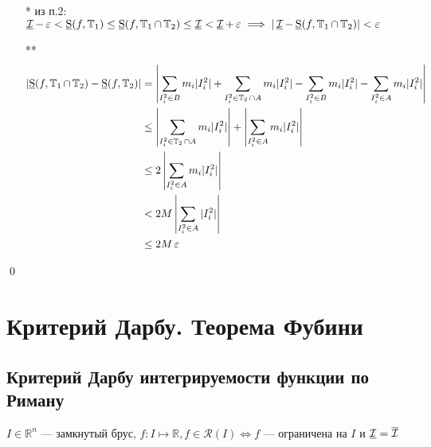 \documentclass[a4paper, 10pt]{article}
\begin{document}
\begin{itemize}
    \item[*] из п.2: $\operatorname{\underline{\mathcal{I}}} - \operatorname{\varepsilon} < \operatorname{\underline{S}}(f, \operatorname{\mathbb{T}}_1) \le \operatorname{\underline{S}}(f, \operatorname{\mathbb{T}}_1\cap \operatorname{\mathbb{T}}_2) \le \operatorname{\underline{\mathcal{I}}} < \operatorname{\underline{\mathcal{I}}} + \operatorname{\varepsilon} \implies |\operatorname{\underline{\mathcal{I}}} - \operatorname{\underline{S}}(f, \operatorname{\mathbb{T}}_1\cap\operatorname{\mathbb{T}}_2)| < \operatorname{\varepsilon}$\\
    \item[**] \begin{equation*}
        \begin{aligned}
            \left|\us(f, \T_1\cap\T_2) - \us(f, \T_2)\right| &= \left|\sum_{I_i^2\in B}m_i|I_i^2| + \sum_{I_i^2\in \T_2\cap A}m_i|I_i^2| - \sum_{I_i^2\in B}m_i|I_i^2| - \sum_{I_i^2\in A}m_i|I_i^2|\right|\\
            &\le \left|\sum_{I_i^2\in \T_2\cap A}m_i|I_i^2|\right| + \left|\sum_{I_i^2\in A}m_i|I_i^2|\right|\\
            &\le 2\left|\sum_{I_i^2\in A}m_i|I_i^2|\right|\\
            &< 2M\left|\sum_{I_i^2\in A}|I_i^2|\right|\\
            &\le 2M\ve
        \end{aligned}
    \end{equation*}
\end{itemize}\qed


\newpage
\section{Критерий Дарбу. Теорема Фубини}
\subsection{Критерий Дарбу интегрируемости функции по Риману}
$I\in\mathbb{R}^n\text{ — замкнутый брус, } f:I\mapsto \mathbb{R}, f\in \mathcal{R}(I)\Longleftrightarrow f$ — ограничена на $I$ и $\operatorname{\underline{\mathcal{I}}}=\operatorname{\overline{\mathcal{I}}}$
\end{document}
